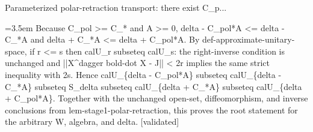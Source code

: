 \documentclass{article}
\newcommand{\step}[1]{\par\noindent\hangindent=3.5em\hangafter=1%
  \makebox[3.5em][l]{\textbf{#1.}}}
\newcommand{\steptag}[1]{\hfill{\small\textsf{[#1]}}}
\begin{document}
\begin{proofbox}{Parameterized polar-retraction transport: there exist C\_p...}
\step{1.4} Because C\_pol >= C\_* and A >= 0, delta - C\_pol*A <= delta - C\_*A and delta + C\_*A <= delta + C\_pol*A. By def-approximate-unitary-space, if r <= s then calU\_r subseteq calU\_s: the right-inverse condition is unchanged and ||X\textasciicircum{}dagger bold-dot X - J|| < 2r implies the same strict inequality with 2s. Hence calU\_\{delta - C\_pol*A\} subseteq calU\_\{delta - C\_*A\} subseteq S\_delta subseteq calU\_\{delta + C\_*A\} subseteq calU\_\{delta + C\_pol*A\}. Together with the unchanged open-set, diffeomorphism, and inverse conclusions from lem-stage1-polar-retraction, this proves the root statement for the arbitrary W, algebra, and delta. \steptag{validated} \\[4pt]
\end{proofbox}
\end{document}
